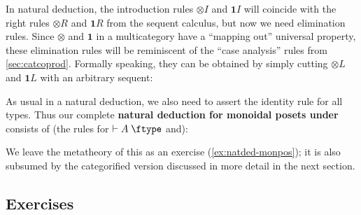 \documentclass{book}
\let\types\vdash
\def\type{\;\ftype}
\def\one{\mathbf{1}}
\let\tensor\otimes
\def\tensorL{\mathord{\tensor}L}
\def\tensorR{\mathord{\tensor}R}
\def\tensorI{\mathord{\tensor}I}
\def\tensorE{\mathord{\tensor}E}
\begin{document}
In natural deduction, the introduction rules $\tensorI$ and $\one I$ will coincide with the right rules $\tensorR$ and $\one R$ from the sequent calculus, but now we need elimination rules.
Since $\tensor$ and $\one$ in a multicategory have a ``mapping out'' universal property, these elimination rules will be reminiscent of the ``case analysis'' rules from \cref{sec:catcoprod}.
Formally speaking, they can be obtained by simply cutting $\tensorL$ and $\one L$ with an arbitrary sequent:
As usual in a natural deduction, we also need to assert the identity rule for all types.
Thus our complete \textbf{natural deduction for monoidal posets under \cG} consists of (the rules for $\types A\type$ and):
We leave the metatheory of this as an exercise (\cref{ex:natded-monpos}); it is also subsumed by the categorified version discussed in more detail in the next section.

\subsection*{Exercises}
\end{document}
